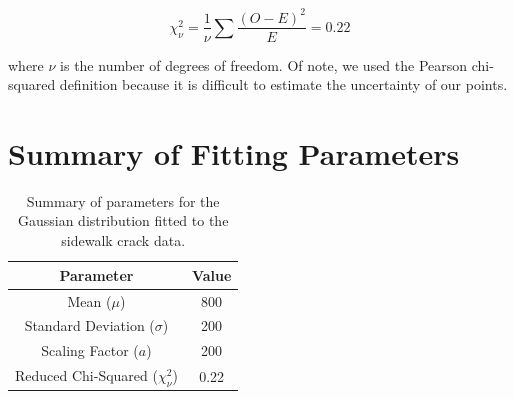 \documentclass{article}
\begin{document}
\[
\chi^2_\nu = \frac{1}{\nu} \sum \frac{(O-E)^2}{E} = 0.22
\]

where $\nu$ is the number of degrees of freedom. Of note, we used the Pearson chi-squared definition because it is difficult to estimate the uncertainty of our points.

\section{Summary of Fitting Parameters}

\begin{table}[H]
    \centering
    \begin{tabular}{|c|c|}
        \hline
        Parameter & Value \\
        \hline
        Mean ($\mu$) & 800 \\
        Standard Deviation ($\sigma$) & 200 \\
        Scaling Factor ($a$) & 200 \\
        Reduced Chi-Squared ($\chi^2_\nu$) & 0.22 \\
        \hline
    \end{tabular}
    \caption{Summary of parameters for the Gaussian distribution fitted to the sidewalk crack data.}
    \label{tab:fitting_parameters}
\end{table}



\nocite{*}
\end{document}
